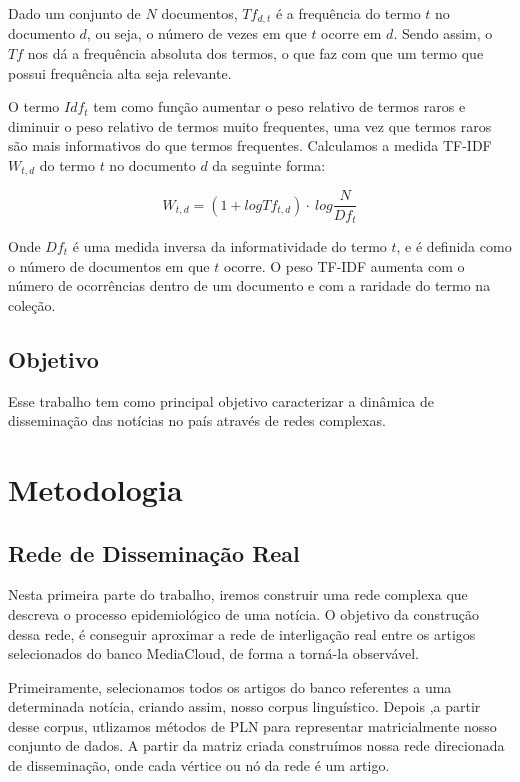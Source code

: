 \documentclass[a4paper,12pt]{article}
\begin{document}
\begin{description}
  Dado um conjunto de $N$ documentos, $Tf_{d,t}$ é a frequência do termo $t$ no documento
  $d$, ou seja, o número de vezes em que $t$ ocorre em $d$. Sendo assim, o $Tf$ nos dá a frequência absoluta dos termos, 
  o que faz com que um termo que possui frequência alta seja relevante.
  
  O termo $Idf_{t}$ tem como função aumentar o peso relativo de termos raros e diminuir o peso relativo de termos muito frequentes,
  uma vez que termos raros são mais informativos do que termos frequentes. Calculamos a medida TF-IDF $ W_{t,d}$ do termo $t$ no documento
  $d$ da seguinte forma:

  $$ W_{t,d} = (1 + log Tf_{t,d}) \cdot \ log \dfrac{N}{Df_{t}}$$

  Onde $Df_{t}$ é uma medida inversa da informatividade do termo $t$, e é definida como o número de documentos em que $t$ ocorre. O peso
  TF-IDF aumenta com o número de ocorrências dentro de um documento e com a raridade do termo na coleção.
\end{description}

\subsection{Objetivo}

Esse trabalho tem como principal objetivo caracterizar a dinâmica de disseminação das notícias no país através de redes complexas.




\pagebreak
\section{Metodologia}

\subsection{Rede de Disseminação Real}

Nesta primeira parte do trabalho, iremos construir uma rede complexa que descreva o processo epidemiológico de uma notícia. O objetivo
da construção dessa rede, é conseguir aproximar a rede de interligação real entre os artigos selecionados do banco
MediaCloud, de forma a torná-la observável.

Primeiramente, selecionamos todos os artigos do banco referentes a uma determinada notícia, criando assim, nosso corpus linguístico.
Depois ,a partir desse corpus, utlizamos métodos de PLN para representar matricialmente nosso conjunto de dados. A partir da matriz 
criada construímos nossa rede direcionada de disseminação, onde cada vértice ou nó da rede é um artigo.
\end{document}

